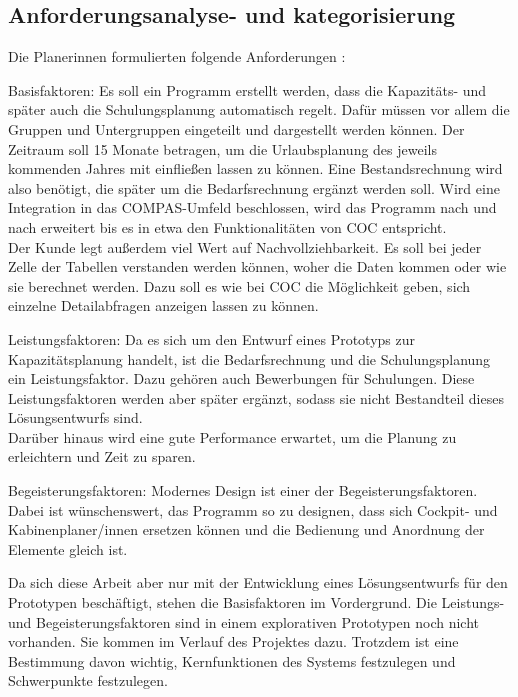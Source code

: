 \documentclass [12pt, a4paper, oneside, titlepage, ngerman]{article}
\begin{document}
\subsection{Anforderungsanalyse- und kategorisierung}
Die Planerinnen formulierten folgende Anforderungen \cite[vgl.][]{Gespraech2}:
\begin{description}
\item Basisfaktoren: Es soll ein Programm erstellt werden, dass die Kapazitäts- und später auch die Schulungsplanung automatisch regelt. Dafür müssen vor allem die Gruppen und Untergruppen eingeteilt und dargestellt werden können. Der Zeitraum soll 15 Monate betragen, um die Urlaubsplanung des jeweils kommenden Jahres mit einfließen lassen zu können. Eine Bestandsrechnung wird also benötigt, die später um die Bedarfsrechnung ergänzt werden soll. Wird eine Integration in das COMPAS-Umfeld beschlossen, wird das Programm nach und nach erweitert bis es in etwa den Funktionalitäten von \ac{COC} entspricht. \\
Der Kunde legt außerdem viel Wert auf Nachvollziehbarkeit. Es soll bei jeder Zelle der Tabellen verstanden werden können, woher die Daten kommen oder wie sie berechnet werden. Dazu soll es wie bei \ac{COC} die Möglichkeit geben, sich einzelne Detailabfragen anzeigen lassen zu können.
\item Leistungsfaktoren: Da es sich um den Entwurf eines Prototyps zur Kapazitätsplanung handelt, ist die Bedarfsrechnung und die Schulungsplanung ein Leistungsfaktor. Dazu gehören auch Bewerbungen für Schulungen. Diese Leistungsfaktoren werden aber später ergänzt, sodass sie nicht Bestandteil dieses Lösungsentwurfs sind. \\
Darüber hinaus wird eine gute Performance erwartet, um die Planung zu erleichtern und Zeit zu sparen.
\item Begeisterungsfaktoren: Modernes Design ist einer der Begeisterungsfaktoren. Dabei ist wünschenswert, das Programm so zu designen, dass sich Cockpit- und Kabinenplaner/innen ersetzen können und die Bedienung und Anordnung der Elemente gleich ist. 
\end{description}
Da sich diese Arbeit aber nur mit der Entwicklung eines Lösungsentwurfs für den Prototypen beschäftigt, stehen die Basisfaktoren im Vordergrund. Die Leistungs- und Begeisterungsfaktoren sind in einem explorativen Prototypen noch nicht vorhanden. Sie kommen im Verlauf des Projektes dazu. Trotzdem ist eine Bestimmung davon wichtig, Kernfunktionen des Systems festzulegen und Schwerpunkte festzulegen.
\end{document}
